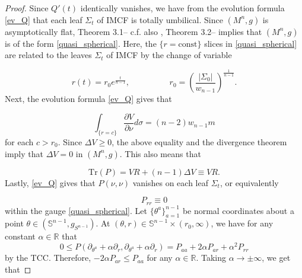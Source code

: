 \documentclass[12pt]{amsart}
\theoremstyle{definition}
\numberwithin{equation}{section}
\begin{document}
\begin{proof}
Since $Q'(t)$ identically vanishes, we have from the evolution formula \eqref{ev_Q} that each leaf $\Sigma_{t}$ of IMCF is totally umbilical. Since $(M^{n},g)$ is asymptotically flat, \cite{HW24a} Theorem 3.1-- c.f. also \cite{HW24}, Theorem 3.2-- implies that $(M^{n},g)$ is of the form \eqref{quasi_spherical}. Here, the $\{ r= \text{const} \}$ slices in \eqref{quasi_spherical} are related to the leaves $\Sigma_{t}$ of IMCF by the change of variable

\begin{equation} \label{trans}
    r(t)= r_{0} e^{\frac{t}{n-1}}, \hspace{2cm} r_{0}= \left( \frac{|\Sigma_{0}|}{w_{n-1}} \right)^{\frac{1}{n-1}}.
\end{equation}
Next, the evolution formula \eqref{ev_Q} gives that

\begin{equation*}
    \int_{\{r=c\}} \frac{\partial V}{\partial \nu} d\sigma = (n-2) w_{n-1} m
\end{equation*}
for each $c > r_{0}$. Since $\Delta V \geq 0$, the above equality and the divergence theorem imply that $\Delta V = 0$ in $(M^{n},g)$. This also means that

\begin{equation} \label{trace}
    \text{Tr} \left( P \right)= V R + (n-1) \Delta V \equiv VR.
\end{equation}
Lastly, \eqref{ev_Q} gives that $P(\nu,\nu)$ vanishes on each leaf $\Sigma_{t}$, or equivalently

\begin{equation} \label{Prr}
    P_{rr} \equiv 0
\end{equation}
within the gauge \eqref{quasi_spherical}. Let $\{ \theta^{a} \}_{a=1}^{n-1}$ be normal coordinates about a point $\theta \in (\mathbb{S}^{n-1},g_{S^{n-1}})$. At $(\theta,r) \in \mathbb{S}^{n-1} \times (r_{0},\infty)$, we have for any constant $\alpha \in \mathbb{R}$ that
\begin{equation*}
    0 \leq P(\partial_{\theta^{a}} + \alpha \partial_{r}, \partial_{\theta^{a}} + \alpha \partial_{r}) = P_{aa} + 2 \alpha P_{ar} + \alpha^{2} P_{rr}
\end{equation*}
by the TCC. Therefore, $-2\alpha P_{ar} \leq P_{aa}$ for any $\alpha \in \mathbb{R}$. Taking $\alpha \rightarrow \pm \infty$, we get that


\end{proof}
\end{document}
